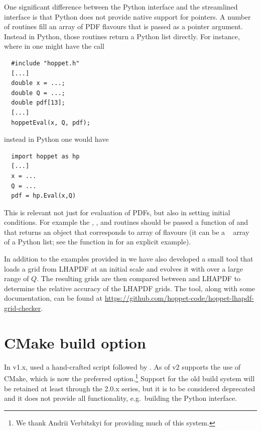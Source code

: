 One significant difference between the Python interface and the
streamlined interface is that Python does not provide native support
for pointers.
%
A number of \CPP routines
fill an array of PDF flavours that is passed as a pointer
argument.
%
Instead in Python, those routines return a
Python list directly.
%
For instance, where in \CPP{}
one might have the call
%
\begin{lstlisting}
  #include "hoppet.h"
  [...]
  double x = ...;
  double Q = ...;
  double pdf[13];
  [...]
  hoppetEval(x, Q, pdf);
\end{lstlisting}
%
instead in Python one would have
%
\begin{lstlisting}
  import hoppet as hp
  [...]
  x = ...
  Q = ...
  pdf = hp.Eval(x,Q)
\end{lstlisting}
This is relevant not just for evaluation of PDFs, but also in setting
initial conditions. 
%
For example the , , and
 routines should be passed a function
of 
 and  that returns an object that corresponds to array
of flavours (it can be a ~\cite{Harris:2020xlr} array of a
Python list; see the  function in
for an explicit example).

In addition to the examples provided in
 we have also developed a small
tool that loads a grid from LHAPDF at an initial scale and evolves it
with \hoppet{} over a large range of $Q$. The resulting grids are then
compared between \hoppet{} and LHAPDF to determine the relative
accuracy of the LHAPDF grids. The tool, along with some documentation,
can be found at
\url{https://github.com/hoppet-code/hoppet-lhapdf-grid-checker}.

\section{CMake build option}
\label{sec:cmake}

In v1.x, \hoppet used a hand-crafted  script followed
by .
%
%
As of v2
% 
\hoppet supports the use of CMake, which is now the preferred option.\footnote{We thank Andrii Verbitskyi
  for providing much of this system.}
%
Support for the old build system will be retained at least through the 2.0.x
series, but it is to be considered deprecated and it does not provide
all functionality, e.g.\ building the Python interface.

